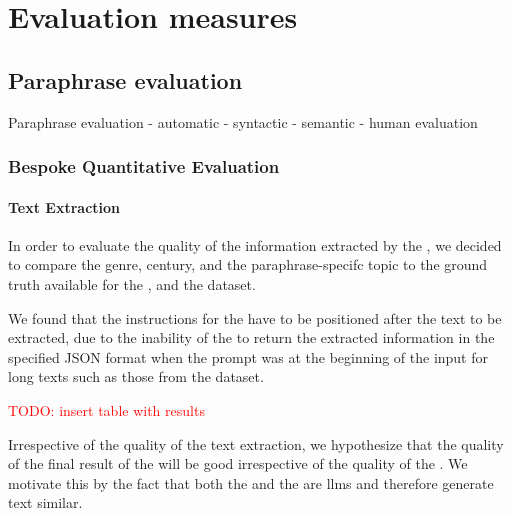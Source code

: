 \chapter{Evaluation measures}
\label{chap:evaluation_measures}



\section{Paraphrase evaluation}
\label{sec:paraphrase_evaluation}

 Paraphrase evaluation
    - automatic
        - syntactic 
        - semantic
    - human evaluation



\subsection{Bespoke Quantitative Evaluation}
\label{subsec:custom_quantitative_evaluation}

\subsubsection{Text Extraction}
\label{subsec:text_extraction}

In order to evaluate the quality of the information extracted by the \pextractor{}, 
we decided to compare the genre, century, and the paraphrase-specifc topic to the 
ground truth available for the \dataBlog{}, \dataGutenberg{} and the \dataCustom{} dataset.

We found that the instructions for the \pextractor{} have to be positioned after the text to be extracted, 
due to the inability of the \pextractor{} to return the extracted information in the specified JSON format 
when the prompt was at the beginning of the input for long texts such as those from the \dataGutenberg{} dataset.

\textcolor{red}{TODO: insert table with results}

Irrespective of the quality of the text extraction, we hypothesize that the quality of the final result of the \pgenerator{} will be good irrespective of the quality of the \pextractor{}.
We motivate this by the fact that both the \pextractor{} and the \pgenerator{} are \acp{llm} and therefore generate text similar.

